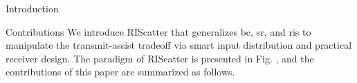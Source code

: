 \documentclass[journal]{IEEEtran}
\begin{document}
\begin{section}{Introduction}


	\begin{subsection}{Contributions}
		We introduce RIScatter that generalizes \gls{bc}, \gls{sr}, and \gls{ris} to manipulate the transmit-assist tradeoff via smart input distribution and practical receiver design.
		The paradigm of RIScatter is presented in Fig. , and the contributions of this paper are summarized as follows.


\end{subsection}
\end{section}
\end{document}
